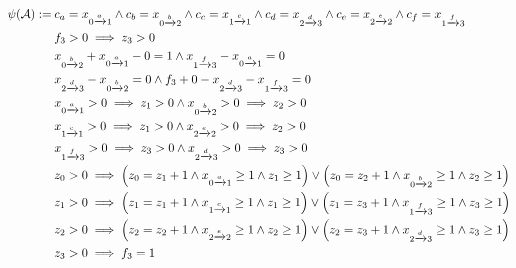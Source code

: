 \documentclass[acmsmall,review,anonymous]{acmart}\settopmatter{printfolios=true,printccs=false,printacmref=true}
\theoremstyle{definition}
\begin{document}
\begin{equation}
  \begin{aligned}
  \operatorname{\psi}(\mathcal{A}):=\:
  &c_{a} = x_{0 \xrightarrow{a} 1} \land c_{b} = x_{0 \xrightarrow{b} 2} \land c_{c} = x_{1 \xrightarrow{c} 1} \land c_{d} = x_{2 \xrightarrow{d} 3} \land c_{e} = x_{2 \xrightarrow{e} 2} \land c_{f} = x_{1 \xrightarrow{f} 3}\\
  &f_{3} > 0 \implies z_{3} > 0\\
  & x_{0 \xrightarrow{b} 2} + x_{0 \xrightarrow{a} 1} - 0 = 1 \land  x_{1 \xrightarrow{f} 3} - x_{0 \xrightarrow{a} 1} = 0\\
  & x_{2 \xrightarrow{d} 3} - x_{0 \xrightarrow{b} 2} = 0 \land f_{3} + 0 - x_{2 \xrightarrow{d} 3} - x_{1 \xrightarrow{f} 3} = 0\\
  &x_{0 \xrightarrow{a} 1} > 0 \implies z_{1} > 0 \land x_{0 \xrightarrow{b} 2} > 0 \implies z_{2} > 0\\
  &x_{1 \xrightarrow{c} 1} > 0 \implies z_{1} > 0 \land x_{2 \xrightarrow{e} 2} > 0 \implies z_{2} > 0\\
  &x_{1 \xrightarrow{f} 3} > 0 \implies z_{3} > 0 \land x_{2 \xrightarrow{d} 3} > 0 \implies z_{3} > 0\\
  &z_{0} > 0 \implies \left(z_{0} = z_{1} + 1 \land x_{0 \xrightarrow{a} 1} \geq 1 \land z_{1} \geq 1\right) \lor \left(z_{0} = z_{2} + 1 \land x_{0 \xrightarrow{b} 2} \geq 1 \land z_{2} \geq 1\right)\\
  &z_{1} > 0 \implies \left(z_{1} = z_{1} + 1 \land x_{1 \xrightarrow{c} 1} \geq 1 \land z_{1} \geq 1\right) \lor \left(z_{1} = z_{3} + 1 \land x_{1 \xrightarrow{f} 3} \geq 1 \land z_{3} \geq 1\right)\\
  &z_{2} > 0 \implies \left(z_{2} = z_{2} + 1 \land x_{2 \xrightarrow{e} 2} \geq 1 \land z_{2} \geq 1\right) \lor \left(z_{2} = z_{3} + 1 \land x_{2 \xrightarrow{d} 3} \geq 1 \land z_{3} \geq 1\right)\\
  &z_{3} > 0 \implies f_{3} = 1
  \end{aligned}
  \end{equation}
\end{document}
